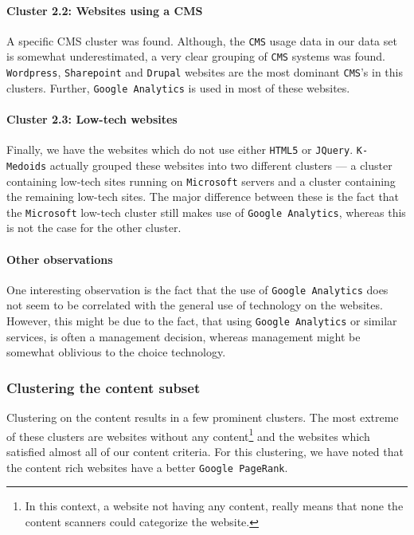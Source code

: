 \paragraph{Cluster 2.2: Websites using a CMS}

A specific CMS cluster was found. Although, the \texttt{CMS} usage data in our data set is somewhat underestimated, a very clear grouping of \texttt{CMS} systems was found. \texttt{Wordpress}, \texttt{Sharepoint} and \texttt{Drupal} websites are the most dominant \texttt{CMS}'s in this clusters. Further, \texttt{Google Analytics} is used in most of these websites.

\paragraph{Cluster 2.3: Low-tech websites}

Finally, we have the websites which do not use either \texttt{HTML5} or \texttt{JQuery}. \texttt{K-Medoids} actually grouped these websites into two different clusters --- a cluster containing low-tech sites running on \texttt{Microsoft} servers and a cluster containing the remaining low-tech sites. The major difference between these is the fact that the \texttt{Microsoft} low-tech cluster still makes use of \texttt{Google Analytics}, whereas this is not the case for the other cluster.

\paragraph{Other observations}

One interesting observation is the fact that the use of \texttt{Google Analytics} does not seem to be correlated with the general use of technology on the websites. However, this might be due to the fact, that using \texttt{Google Analytics} or similar services, is often a management decision, whereas management might be somewhat oblivious to the choice technology.

\subsubsection{Clustering the content subset}

Clustering on the content results in a few prominent clusters. The most extreme of these clusters are websites without any content\footnote{In this context, a website not having any content, really means that none the content scanners could categorize the website.} and the websites which satisfied almost all of our content criteria. For this clustering, we have noted that the content rich websites have a better \texttt{Google PageRank}.

